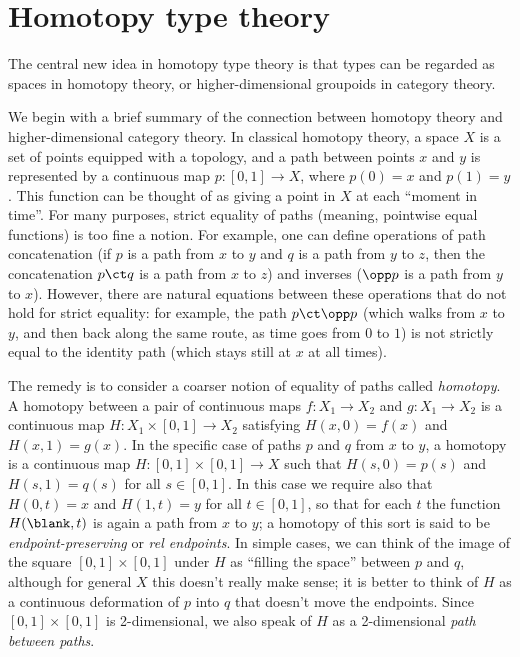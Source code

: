 \chapter{Homotopy type theory}
\label{cha:basics}

The central new idea in homotopy type theory is that types can be regarded as
spaces in homotopy theory, or higher-dimensional groupoids in category
theory.

We begin with a brief summary of the connection between homotopy theory
and higher-dimensional category theory.
In classical homotopy theory, a space $X$ is a set of points equipped
with a topology,
and a path between points $x$ and $y$ is represented by
a continuous map $p : [0,1] \to X$, where $p(0) = x$ and $p(1) = y$.
This function can be thought of as giving a point in $X$ at each
``moment in time''.  For many purposes, strict equality of paths
(meaning, pointwise equal functions) is too fine a notion.  For example,
one can define operations of path concatenation (if $p$ is a path from
$x$ to $y$ and $q$ is a path from $y$ to $z$, then the concatenation $p
\ct q$ is a path from $x$ to $z$) and inverses ($\opp p$ is a path
from $y$ to $x$).  However, there are natural equations between these
operations that do not hold for strict equality: for example, the path
$p \ct \opp p$ (which walks from $x$ to $y$, and then back along the
same route, as time goes from $0$ to $1$) is not strictly equal to the
identity path (which stays still at $x$ at all times).

The remedy is to consider a coarser notion of equality of paths called
\emph{homotopy}.
A homotopy between a pair of continuous maps $f :
X_1 \to X_2$ and $g : X_1\to X_2$ is a continuous map $H : X_1
\times [0, 1] \to X_2$ satisfying $H(x, 0) = f (x)$ and $H(x, 1) =
g(x)$.  In the specific case of paths $p$ and $q$ from $x$ to $y$, a homotopy is a
continuous map $H : [0,1] \times [0,1] \rightarrow X$
such that $H(s,0) = p(s)$ and $H(s,1) = q(s)$ for all $s\in [0,1]$.
In this case we require also that $H(0,t) = x$ and $H(1,t)=y$ for all $t\in [0,1]$,
so that for each $t$ the function $H(\blank,t)$ is again a path from $x$ to $y$;
a homotopy of this sort is said to be \emph{endpoint-preserving} or \emph{rel endpoints}.
In simple cases, we can think of the image of the square $[0,1]\times [0,1]$ under $H$ as ``filling the space'' between $p$ and $q$, although for general $X$ this doesn't really make sense; it is better to think of $H$ as a continuous deformation of $p$ into $q$ that doesn't move the endpoints.
Since $[0,1]\times [0,1]$ is 2-dimensional, we also speak of $H$ as a 2-dimensional \emph{path between paths}.

